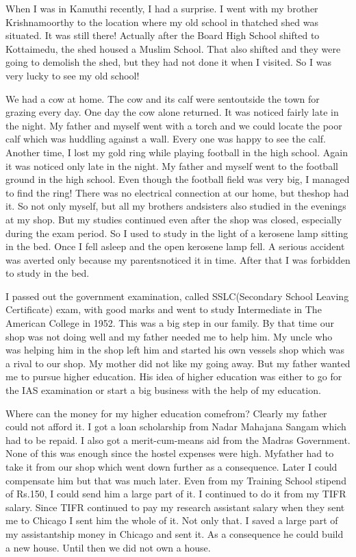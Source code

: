 When I was in Kamuthi recently, I had a surprise. I went with my brother 
Krishnamoorthy to the location where my old school in thatched shed was 
situated. It was still there! Actually after the Board High School 
shifted to Kottaimedu, the shed housed a Muslim School. That also 
shifted and they were going to demo\-lish the shed, but they had not done 
it when I visited. So I was very lucky to see my old school!

We had a cow at home. The cow and its calf were sent\break outside the town 
for grazing every day. One day the cow alone returned. It was noticed 
fairly late in the night. My father and myself went with a torch and we 
could locate the poor calf which was huddling against a wall. Every one 
was happy to see the calf.
\vskip 1pt
Another time, I lost my gold ring while playing football in the high 
school. Again it was noticed only late in the night. My father and 
myself went to the football ground in the high school. Even though the 
football field was very big, I managed to find the ring!
\vskip 1pt
There was no electrical connection at our home, but the\break shop had it. So 
not only myself, but all my brothers and\break sisters also studied in the 
evenings at my shop. But my studies\- continued even after the shop was 
closed, especially during the exam period. So I used to study in the 
light of a kerosene lamp sitting in the bed. Once I fell asleep and the 
open kerosene lamp fell. A serious accident was averted only because my 
parents\break noticed it in time. After that I was forbidden to study in the 
bed.

I passed out the government examination, called SSLC\break (Secondary School 
Leaving Certificate) exam, with good marks and went to study 
Intermediate in The American College in 1952. This was a big step in our 
family. By that time our shop was not doing well and my father needed me 
to help him. My uncle who was helping him in the shop left him and 
started his own vessels shop which was a rival to our shop. My mother 
did not like my going away. But my father wanted me to pursue higher 
education. His idea of higher education was either to go for the IAS 
examination or start a big business with the help of my education.

Where can the money for my higher education come\break from? Clearly my father 
could not afford it. I got a loan scholar\-ship from Nadar Mahajana Sangam 
which had to be repaid. I also got a merit-cum-means aid from the Madras 
Government. None of this was enough since the hostel expenses were high. 
My\break father had to take it from our shop which went down further as a 
consequence. Later I could compensate him but that was much later. Even 
from my Training School stipend of Rs.150, I could send him a large part 
of it. I continued to do it from my TIFR salary. Since TIFR continued to 
pay my research assistant salary when they sent me to Chicago I sent him 
the whole of it. Not only that. I saved a large part of my assistantship 
money in Chicago and sent it. As a consequence he could build a new 
house. Until then we did not own a house.

